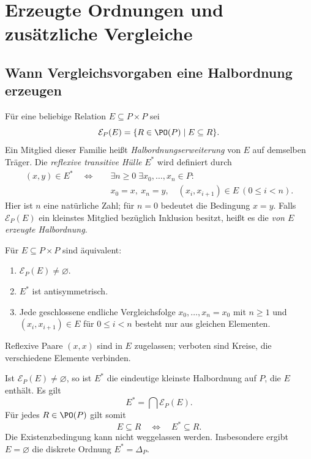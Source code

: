 \chapter{Erzeugte Ordnungen und zusätzliche Vergleiche}
\label{b12guide:ch:generated}

\section{Wann Vergleichsvorgaben eine Halbordnung erzeugen}

\begin{definition}
\label{b12guide:def:generated}
Für eine beliebige Relation $E\subseteq P\times P$ sei
\[
 \mathcal E_P(E)=\{R\in\PO(P)\mid E\subseteq R\}.
\]
Ein Mitglied dieser Familie heißt \emph{Halbordnungserweiterung}
von $E$ auf demselben Träger.
Die \emph{reflexive transitive Hülle} $E^*$ wird definiert durch
\[
\begin{aligned}
 (x,y)\in E^*\quad\Longleftrightarrow\quad
 &\exists n\geq0\;\exists x_0,\ldots,x_n\in P:\\[-.3em]
 &x_0=x,\ x_n=y,\quad
   (x_i,x_{i+1})\in E\ (0\leq i<n).
\end{aligned}
\]
Hier ist $n$ eine natürliche Zahl; für $n=0$ bedeutet die
Bedingung $x=y$. Falls $\mathcal E_P(E)$ ein kleinstes Mitglied
bezüglich Inklusion besitzt, heißt es die \emph{von $E$ erzeugte
Halbordnung}.
\end{definition}

\begin{theorem}
\label{b12guide:thm:extension-exists}
Für $E\subseteq P\times P$ sind äquivalent:
\begin{enumerate}
\item $\mathcal E_P(E)\ne\varnothing$.
\item $E^*$ ist antisymmetrisch.
\item Jede geschlossene endliche Vergleichsfolge
$x_0,\ldots,x_n=x_0$ mit $n\geq1$ und
$(x_i,x_{i+1})\in E$ für $0\leq i<n$ besteht nur aus gleichen
Elementen.
\end{enumerate}
Reflexive Paare $(x,x)$ sind in $E$ zugelassen; verboten sind
Kreise, die verschiedene Elemente verbinden.
\end{theorem}

\begin{theorem}
\label{b12guide:thm:generated}
Ist $\mathcal E_P(E)\ne\varnothing$, so ist $E^*$ die eindeutige
kleinste Halbordnung auf $P$, die $E$ enthält. Es gilt
\[
 E^*=\bigcap\mathcal E_P(E).
\]
Für jedes $R\in\PO(P)$ gilt somit
\[
 E\subseteq R\quad\Longleftrightarrow\quad E^*\subseteq R.
\]
Die Existenzbedingung kann nicht weggelassen werden.
Insbesondere ergibt $E=\varnothing$ die diskrete Ordnung
$E^*=\Delta_P$.
\end{theorem}

